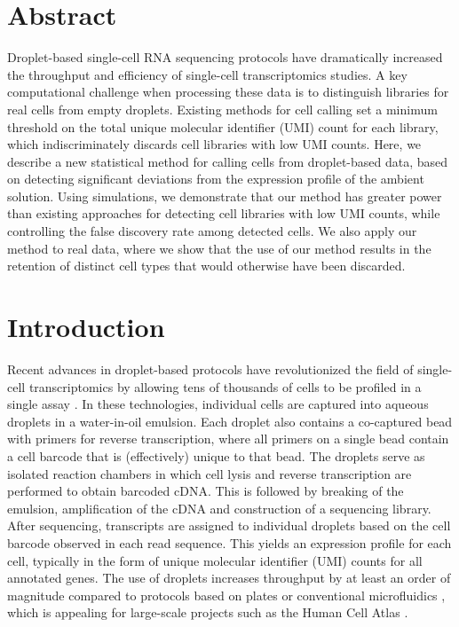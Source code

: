 \documentclass[10pt,letterpaper]{article}
\begin{document}
\section*{Abstract}
Droplet-based single-cell RNA sequencing protocols have dramatically increased the throughput and efficiency of single-cell transcriptomics studies.
A key computational challenge when processing these data is to distinguish libraries for real cells from empty droplets.
Existing methods for cell calling set a minimum threshold on the total unique molecular identifier (UMI) count for each library, 
which indiscriminately discards cell libraries with low UMI counts.
Here, we describe a new statistical method for calling cells from droplet-based data, based on detecting significant deviations from the expression profile of the ambient solution.
Using simulations, we demonstrate that our method has greater power than existing approaches for detecting cell libraries with low UMI counts, 
while controlling the false discovery rate among detected cells.
We also apply our method to real data, where we show that the use of our method results in the retention of distinct cell types that would otherwise have been discarded.

\section*{Introduction}
Recent advances in droplet-based protocols have revolutionized the field of single-cell transcriptomics by allowing tens of thousands of cells to be profiled in a single assay \cite{macosko2015highly,klein2015droplet,zheng2017massively}.
In these technologies, individual cells are captured into aqueous droplets in a water-in-oil emulsion.
Each droplet also contains a co-captured bead with primers for reverse transcription, where all primers on a single bead contain a cell barcode that is (effectively) unique to that bead.
The droplets serve as isolated reaction chambers in which cell lysis and reverse transcription are performed to obtain barcoded cDNA.
This is followed by breaking of the emulsion, amplification of the cDNA and construction of a sequencing library.
After sequencing, transcripts are assigned to individual droplets based on the cell barcode observed in each read sequence.
This yields an expression profile for each cell, typically in the form of unique molecular identifier (UMI) counts \cite{islam2014quantitative} for all annotated genes. 
The use of droplets increases throughput by at least an order of magnitude compared to protocols based on plates \cite{picelli2013smartseq2} or conventional microfluidics \cite{pollen2014low}, which is appealing for large-scale projects such as the Human Cell Atlas \cite{regev2017human}.
\end{document}
